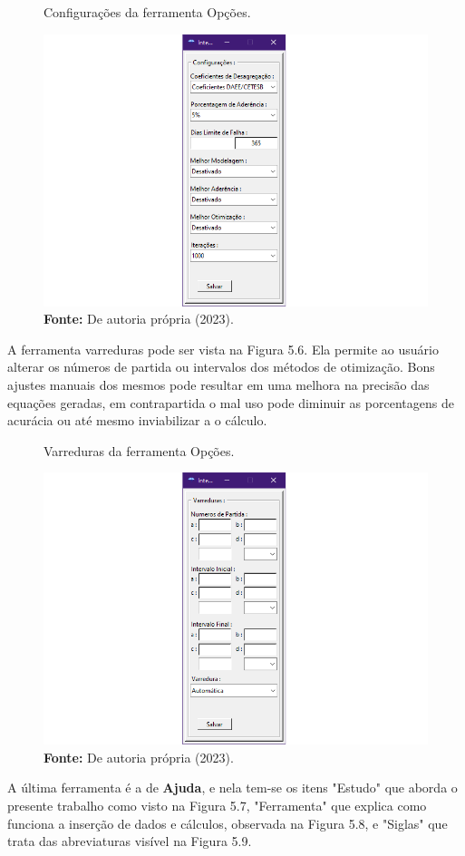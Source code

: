\newpage

\begin{figure}[!ht]
	\centering
	\caption{Configurações da ferramenta Opções.}
	\includegraphics[width=.7625\linewidth]{figuras/configuracoes.png}
	\caption*{\textbf{Fonte:} De autoria própria (2023).}
	\label{fig:figuras/configuracoes.png}
\end{figure}

A ferramenta varreduras pode ser vista na Figura 5.6. Ela permite ao usuário alterar os números de partida ou intervalos dos métodos de otimização. Bons ajustes manuais dos mesmos pode resultar em uma melhora na precisão das equações geradas, em contrapartida o mal uso pode diminuir as porcentagens de acurácia ou até mesmo inviabilizar a o cálculo.\bigskip

\begin{figure}[!ht]
	\centering
	\caption{Varreduras da ferramenta Opções.}
	\includegraphics[width=.7625\linewidth]{figuras/varreduras.png}
	\caption*{\textbf{Fonte:} De autoria própria (2023).}
	\label{fig:figuras/varreduras.png}
\end{figure}

A última ferramenta é a de \textbf{Ajuda}, e nela tem-se os itens "Estudo" que aborda o presente trabalho como visto na Figura 5.7, "Ferramenta" que explica como funciona a inserção de dados e cálculos, observada na Figura 5.8, e "Siglas" que trata das abreviaturas visível na Figura 5.9.\bigskip

